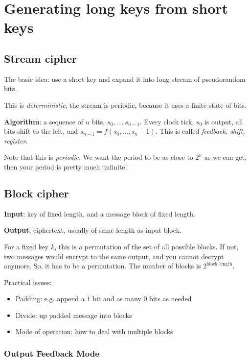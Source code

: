 \documentclass[language=english,number=]{homework}
\begin{document}
    \newpage
    \section{Generating long keys from short keys}

    \subsection{Stream cipher}

    The basic idea: use a short key and expand it into long stream of pseudorandom bits.

    This is \textit{deterministic}, the stream is periodic, because it uses a finite state of bits.

    \textbf{Algorithm}: a sequence of $n$ bits, $s_0, \dots, s_{n-1}$.
    Every clock tick, $s_0$ is output, all bits shift to the left, and $s_{n-1} = f(s_0, \dots, s_n-1)$.
    This is called \textit{feedback, shift, register}.

    Note that this is \textit{periodic}.
    We want the period to be as close to $2^n$ as we can get, then your period is pretty much `infinite'.

    \subsection{Block cipher}

    \textbf{Input}: key of fixed length, and a message block of fixed length.

    \textbf{Output}: ciphertext, usually of same length as input block.

    For a fixed key $k$, this is a permutation of the set of all possible blocks.
    If not, two messages would encrypt to the same output, and you cannot decrypt anymore.
    So, it has to be a permutation.
    The number of blocks is $2^{\text{block length}}$.

    Practical issues:
    \begin{itemize}
        \item Padding: e.g. append a $1$ bit and as many $0$ bits as needed
        \item Divide: up padded message into blocks
        \item Mode of operation: how to deal with multiple blocks
    \end{itemize}

    \subsubsection{Output Feedback Mode}
\end{document}

